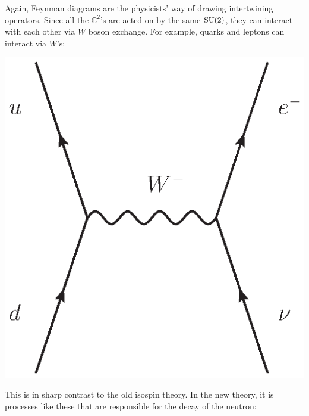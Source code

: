 \documentclass[12pt]{article}
\newcommand{\C}{{\mathbb C}}  %
\newcommand{\SU}{{\rm SU}}    %
\begin{document}
Again, Feynman diagrams are the physicists' way of drawing
intertwining operators.  Since all the $\C^2$'s are acted on by the same
$\SU(2)$, they can interact with each other via $W$ boson exchange. For
example, quarks and leptons can interact via $W$'s:
\begin{center}
	\includegraphics[scale=0.75]{qlW_exchange}
\end{center}
This is in sharp contrast to the old isospin theory.
In the new theory, it is processes like these that are
responsible for the decay of the neutron:
\end{document}
